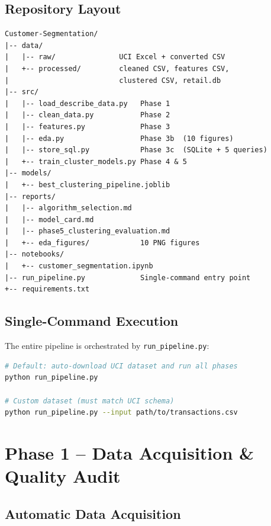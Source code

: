 \documentclass[12pt,a4paper]{report}
\begin{document}
\section{Repository Layout}

\begin{graybox}
\begin{verbatim}
Customer-Segmentation/
|-- data/
|   |-- raw/               UCI Excel + converted CSV
|   +-- processed/         cleaned CSV, features CSV,
|                          clustered CSV, retail.db
|-- src/
|   |-- load_describe_data.py   Phase 1
|   |-- clean_data.py           Phase 2
|   |-- features.py             Phase 3
|   |-- eda.py                  Phase 3b  (10 figures)
|   |-- store_sql.py            Phase 3c  (SQLite + 5 queries)
|   +-- train_cluster_models.py Phase 4 & 5
|-- models/
|   +-- best_clustering_pipeline.joblib
|-- reports/
|   |-- algorithm_selection.md
|   |-- model_card.md
|   |-- phase5_clustering_evaluation.md
|   +-- eda_figures/            10 PNG figures
|-- notebooks/
|   +-- customer_segmentation.ipynb
|-- run_pipeline.py             Single-command entry point
+-- requirements.txt
\end{verbatim}
\end{graybox}

\section{Single-Command Execution}

The entire pipeline is orchestrated by \texttt{run\_pipeline.py}:

\begin{lstlisting}[language=bash, caption={Running the full pipeline}]
# Default: auto-download UCI dataset and run all phases
python run_pipeline.py

# Custom dataset (must match UCI schema)
python run_pipeline.py --input path/to/transactions.csv
\end{lstlisting}

\chapter{Phase 1 -- Data Acquisition \& Quality Audit}

\section{Automatic Data Acquisition}
\end{document}
